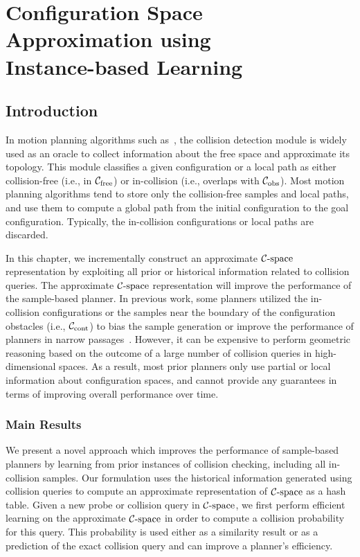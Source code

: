\chapter[Configuration Space Approximation using Instance-based Learning]{Configuration Space Approximation \mbox{using} \\ Instance-based Learning} 
\label{chp:IBL}

\section{Introduction}
In motion planning algorithms such as~\cite{Kavraki96, Kuffner00}, the collision detection module is widely used as an oracle to collect information about the free space and approximate its topology. This module classifies a given configuration or a local path as either collision-free (i.e., in $\mathcal C_{\text{free}}$) or in-collision (i.e., overlaps with $\mathcal C_{\text{obs}}$). Most motion planning algorithms tend to store only the collision-free samples and local paths, and use them to compute a global path from the initial configuration to the goal configuration. Typically, the in-collision configurations or local paths are discarded.

In this chapter, we incrementally construct an approximate $\mathcal C\text{-space}$ representation by exploiting all prior or historical information related to collision queries. The approximate $\mathcal C\text{-space}$ representation will improve the performance of the sample-based planner. In previous work, some planners utilized the in-collision configurations or the samples near the boundary of the configuration obstacles (i.e., $\mathcal C_\text{cont}$) to bias the sample generation or improve the performance of planners in narrow passages~\cite{Boor:1999:ICRA,Jory:2011:IROS,Rodriguez:2006,Zheng:2005}. However, it can be expensive to perform geometric reasoning based on the outcome of a large number of collision queries in high-dimensional spaces. As a result, most prior planners only use partial or local information about configuration spaces, and cannot provide any guarantees in terms of improving overall performance over time.
\subsection{Main Results}
We present a novel approach which improves the performance of sample-based planners by learning from prior instances of collision checking, including all in-collision samples. Our formulation uses the historical information generated using collision queries to compute an approximate representation of $\mathcal C\text{-space}$ as a hash table. Given a new probe or collision query in $\mathcal C\text{-space}$, we first perform efficient learning on the approximate $\mathcal C\text{-space}$ in order to compute a collision probability for this query. This probability is used either as a similarity result or as a prediction of the exact collision query and can improve a planner's efficiency.

